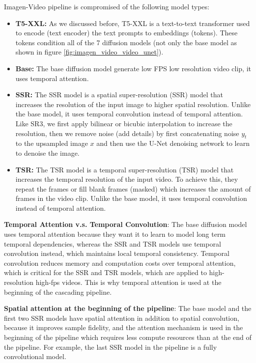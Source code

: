 Imagen-Video pipeline is compromised of the following model types:

\begin{itemize}
    \item \textbf{T5-XXL:} As we discussed before, T5-XXL is a text-to-text transformer used to encode (text encoder) the text prompts to embeddings (tokens). These tokens condition all of the 7 diffusion models (not only the base model as shown in figure \ref{fig:imagen_video_video_unet}).
    \item \textbf{Base:} The base diffusion model generate low FPS low resolution video clip, it uses temporal attention.
    \item \textbf{SSR:} The SSR model is a spatial super-resolution (SSR) model that increases the resolution of the input image to higher spatial resolution. Unlike the base model, it uses temporal convolution instead of temporal attention. Like SR3, we first apply bilinear or bicubic interpolation to increase the resolution, then we remove noise (add details) by first concatenating noise $y_t$ to the upsampled image $x$ and then use the U-Net denoising network to learn to denoise the image.
    \item \textbf{TSR:} The TSR model is a temporal super-resolution (TSR) model that increases the temporal resolution of the input video. To achieve this, they repeat the frames or fill blank frames (masked) which increases the amount of frames in the video clip. Unlike the base model, it uses temporal convolution instead of temporal attention.
\end{itemize}


\textbf{Temporal Attention v.s. Temporal Convolution}: The base diffusion model uses temporal attention because they want it to learn to model long term temporal dependencies, whereas the SSR and TSR models use temporal convolution instead, which maintains local temporal consistency. Temporal convolution reduces memory and computation costs over temporal attention, which is critical for the SSR and TSR models, which are applied to high-resolution high-fps videos. This is why temporal attention is used at the beginning of the cascading pipeline.

\textbf{Spatial attention at the beginning of the pipeline}: The base model and the first two SSR models have spatial attention in addition to spatial convolution, because it improves sample fidelity, and the attention mechanism is used in the beginning of the pipeline which requires less compute resources than at the end of the pipeline. For example, the last SSR model in the pipeline is a fully convolutional model.

